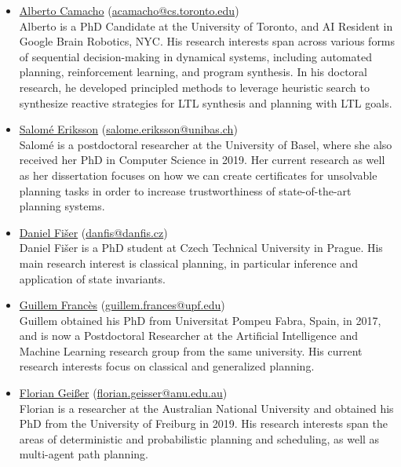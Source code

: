 \documentclass[10pt]{article}
\begin{document}
\begin{itemize}

\item \href{http://www.albertocamacho.com/}{Alberto Camacho}
(\href{mailto:acamacho@cs.toronto.edu}{acamacho@cs.toronto.edu})\\
Alberto is a PhD Candidate at the University of Toronto, and AI Resident in
Google Brain Robotics, NYC. His research interests span across various
forms of sequential decision-making in dynamical systems, including
automated planning, reinforcement learning, and program synthesis. In
his doctoral research, he developed principled methods to leverage
heuristic search to synthesize reactive strategies for LTL synthesis and
planning with LTL goals.

\item \href{https://ai.dmi.unibas.ch/people/eriksson/}{Salom\'{e} Eriksson}
(\href{mailto:salome.eriksson@unibas.ch}{salome.eriksson@unibas.ch})\\
Salom\'{e} is a postdoctoral researcher at the University of Basel, where she also received
her PhD in Computer Science in 2019. Her current research as well as her
dissertation focuses on how we can create certificates for
unsolvable planning tasks in order to increase trustworthiness of
state-of-the-art planning systems.

\item \href{http://cs.fel.cvut.cz/en/people/fiserdan}{Daniel Fi\v{s}er}
(\href{mailto:danfis@danfis.cz}{danfis@danfis.cz})\\
Daniel Fi\v{s}er is a PhD student at Czech Technical University in Prague.
His main research interest is classical planning, in particular inference and
application of state invariants.

\item \href{https://www.upf.edu/web/ai-ml/entry/-/-/31934/adscripcion/guillem-franc%C3%A8s}{Guillem Franc\`{e}s}
    (\href{mailto:guillem.frances@upf.edu}{guillem.frances@upf.edu})\\
Guillem obtained his PhD from Universitat Pompeu Fabra, Spain, in 2017, and
is now a Postdoctoral Researcher at the Artificial Intelligence and Machine
Learning research group from the same university.
His current research interests focus on classical and generalized planning.

\item \href{https://cecs.anu.edu.au/people/florian-geisser}{Florian Gei{\ss}er}
(\href{mailto:florian.geisser@anu.edu.au}{florian.geisser@anu.edu.au})\\
Florian is a researcher at the Australian National University and obtained his
PhD from the University of Freiburg in 2019. His research interests span the
areas of deterministic and probabilistic planning and scheduling, as well as
multi-agent path planning.


\end{itemize}
\end{document}
